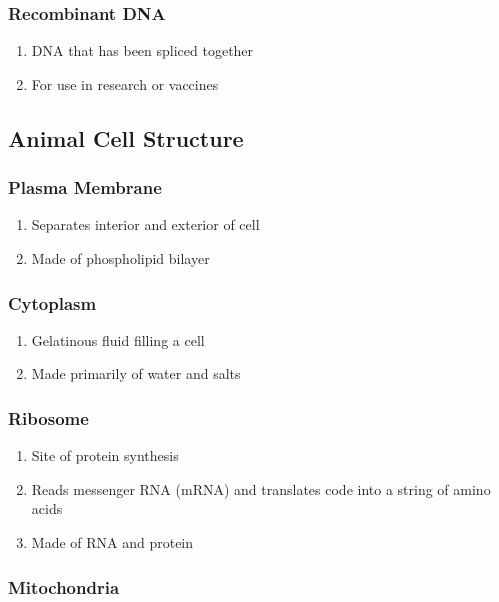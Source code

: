 \documentclass{notes}
\begin{document}
\subsubsection*{Recombinant DNA}

\begin{enumerate}
    \item DNA that has been spliced together
    \item For use in research or vaccines
\end{enumerate}

\subsection{Animal Cell Structure}

\subsubsection*{Plasma Membrane}

\begin{enumerate}
    \item Separates interior and exterior of cell
    \item Made of phospholipid bilayer
\end{enumerate}

\subsubsection*{Cytoplasm}

\begin{enumerate}
    \item Gelatinous fluid filling a cell
    \item Made primarily of water and salts
\end{enumerate}

\subsubsection*{Ribosome}

\begin{enumerate}
    \item Site of protein synthesis
    \item Reads messenger RNA (mRNA) and translates code into a string of amino acids
    \item Made of RNA and protein
\end{enumerate}

\subsubsection*{Mitochondria}
\end{document}
